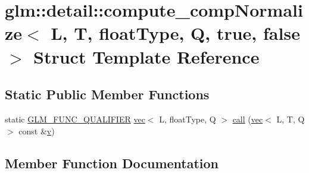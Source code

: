 \hypertarget{structglm_1_1detail_1_1compute__comp_normalize_3_01_l_00_01_t_00_01float_type_00_01_q_00_01true_00_01false_01_4}{}\section{glm\+:\+:detail\+:\+:compute\+\_\+comp\+Normalize$<$ L, T, float\+Type, Q, true, false $>$ Struct Template Reference}
\label{structglm_1_1detail_1_1compute__comp_normalize_3_01_l_00_01_t_00_01float_type_00_01_q_00_01true_00_01false_01_4}
\subsection*{Static Public Member Functions}
\begin{DoxyCompactItemize}
\item 
static \hyperlink{setup_8hpp_a33fdea6f91c5f834105f7415e2a64407}{G\+L\+M\+\_\+\+F\+U\+N\+C\+\_\+\+Q\+U\+A\+L\+I\+F\+I\+ER} \hyperlink{structglm_1_1vec}{vec}$<$ L, float\+Type, Q $>$ \hyperlink{structglm_1_1detail_1_1compute__comp_normalize_3_01_l_00_01_t_00_01float_type_00_01_q_00_01true_00_01false_01_4_a78d43a126b5ff756a41670dd6e0624d9}{call} (\hyperlink{structglm_1_1vec}{vec}$<$ L, T, Q $>$ const \&\hyperlink{_s_d_l__opengl_8h_a10a82eabcb59d2fcd74acee063775f90}{v})
\end{DoxyCompactItemize}


\subsection{Member Function Documentation}
\mbox{\label{structglm_1_1detail_1_1compute__comp_normalize_3_01_l_00_01_t_00_01float_type_00_01_q_00_01true_00_01false_01_4_a78d43a126b5ff756a41670dd6e0624d9}} 
